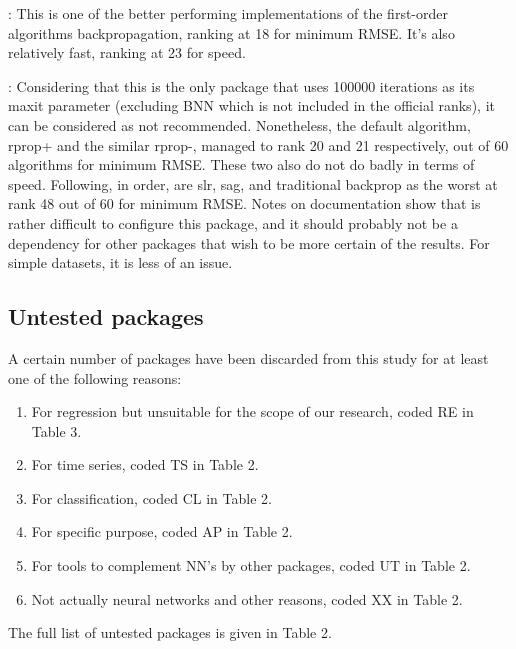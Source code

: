 \citep{R-deepnet}: This is one of the better
performing implementations of the first-order algorithms
backpropagation, ranking at 18 for minimum RMSE. It's also relatively
fast, ranking at 23 for speed.

 \citep{R-neuralnet}: Considering that this is the
only package that uses 100000 iterations as its maxit parameter
(excluding BNN which is not included in the official ranks), it can be
considered as not recommended. Nonetheless, the default algorithm,
rprop+ and the similar rprop-, managed to rank 20 and 21 respectively,
out of 60 algorithms for minimum RMSE. These two also do not do badly in
terms of speed. Following, in order, are slr, sag, and traditional
backprop as the worst at rank 48 out of 60 for minimum RMSE. Notes on
documentation show that is rather difficult to configure this package,
and it should probably not be a dependency for other packages that wish
to be more certain of the results. For simple datasets, it is less of an
issue.

\hypertarget{untested-packages}{%
\subsection{Untested packages}\label{untested-packages}}

A certain number of packages have been discarded from this study for at
least one of the following reasons:

\begin{enumerate}
\def\labelenumi{\arabic{enumi}.}
\tightlist
\item
  For regression but unsuitable for the scope of our research, coded RE
  in Table 3.
\item
  For time series, coded TS in Table 2.
\item
  For classification, coded CL in Table 2.
\item
  For specific purpose, coded AP in Table 2.
\item
  For tools to complement NN's by other packages, coded UT in Table 2.
\item
  Not actually neural networks and other reasons, coded XX in Table 2.
\end{enumerate}

The full list of untested packages is given in Table 2.

